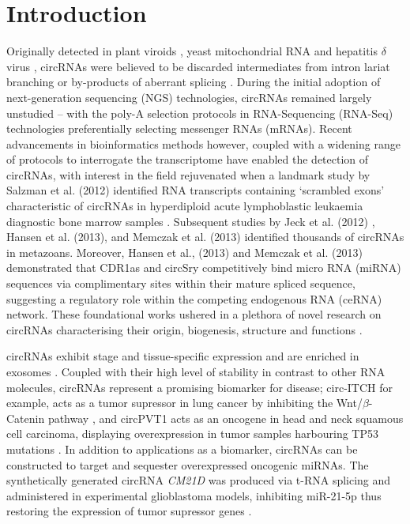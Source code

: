 \documentclass[journal,review,submit,pdftex,moreauthors]{Definitions/mdpi}
\begin{document}

\section{Introduction}
Originally detected in plant viroids \cite{Sanger1976}, yeast mitochondrial RNA \cite{Arnberg1980Feb} and hepatitis $\delta$ virus \cite{Kos1986Oct}, circRNAs were believed to be discarded intermediates from intron lariat branching or by-products of aberrant splicing \cite{Cocquerelle1993Jan, Qian1992}. During the initial adoption of next-generation sequencing (NGS) technologies, circRNAs remained largely unstudied -- with the poly-A selection protocols in RNA-Sequencing (RNA-Seq) technologies preferentially selecting messenger RNAs (mRNAs). Recent advancements in bioinformatics methods however, coupled with a widening range of protocols to interrogate the transcriptome have enabled the detection of circRNAs, with interest in the field rejuvenated when a landmark study by Salzman et al. (2012) identified RNA transcripts containing `scrambled exons' characteristic of circRNAs in hyperdiploid acute lymphoblastic leukaemia diagnostic bone marrow samples \cite{Salzman2012}. Subsequent studies by Jeck et al. (2012) \cite{Jeck2012Dec}, Hansen et al. (2013), \cite{Hansen2013Mar} and Memczak et al. (2013) \cite{find_circ} identified thousands of circRNAs in metazoans. Moreover, Hansen et al., (2013) \cite{Hansen2013Mar} and Memczak et al. (2013) \cite{find_circ} demonstrated that CDR1as and circSry competitively bind micro RNA (miRNA) sequences via complimentary sites within their mature spliced sequence, suggesting a regulatory role within the competing endogenous RNA (ceRNA) network. These foundational works ushered in a plethora of novel research on circRNAs characterising their origin, biogenesis, structure and functions \cite{Danan2012Apr, Jeck2014May, Ashwal-Fluss2014Oct, Chen2015Apr}. \par

circRNAs exhibit stage and tissue-specific expression \cite{circRNA_finder, Gruner2016, Rybak-Wolf2015Jun} and are enriched in exosomes \cite{Li2015Apr}. Coupled with their high level of stability in contrast to other RNA molecules, circRNAs represent a promising biomarker for disease; circ-ITCH for example, acts as a tumor supressor in lung cancer by inhibiting the Wnt/$\beta$-Catenin pathway \cite{Wan2016}, and circPVT1 acts as an oncogene in head and neck squamous cell carcinoma, displaying overexpression in tumor samples harbouring TP53 mutations \cite{Verduci2017Dec}. In addition to applications as a biomarker, circRNAs can be constructed to target and sequester overexpressed oncogenic miRNAs. The synthetically generated circRNA \textit{CM21D} was produced via t-RNA splicing and administered in experimental glioblastoma models, inhibiting miR-21-5p thus restoring the expression of tumor supressor genes \cite{Bayat2023Jun}. \par
\end{document}
